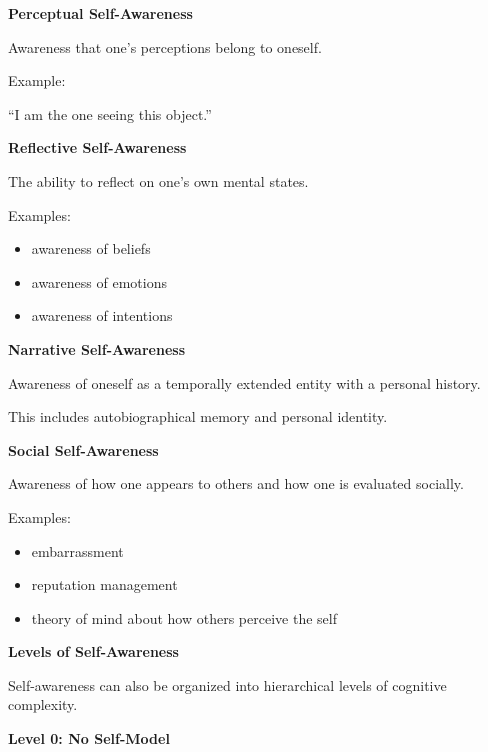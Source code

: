 \documentclass{book}
\providecommand{\ProjectDeepHeading}[2]{%
    \par\medskip\noindent\textbf{#2}\par\smallskip
}
\begin{document}
        \ProjectDeepHeading{7}{Perceptual Self-Awareness}
            
            Awareness that one's perceptions belong to oneself.
            
            Example:
            
            ``I am the one seeing this object.''
        
        \ProjectDeepHeading{7}{Reflective Self-Awareness}
            
            The ability to reflect on one's own mental states.
            
            Examples:
            
            \begin{itemize}
                \item awareness of beliefs
                \item awareness of emotions
                \item awareness of intentions
            \end{itemize}
        
        \ProjectDeepHeading{7}{Narrative Self-Awareness}
            
            Awareness of oneself as a temporally extended entity with a personal history.
            
            This includes autobiographical memory and personal identity.
        
        \ProjectDeepHeading{7}{Social Self-Awareness}
            
            Awareness of how one appears to others and how one is evaluated socially.
            
            Examples:
            
            \begin{itemize}
                \item embarrassment
                \item reputation management
                \item theory of mind about how others perceive the self
            \end{itemize}
    
    
    \ProjectDeepHeading{6}{Levels of Self-Awareness}
        
        Self-awareness can also be organized into hierarchical levels of cognitive complexity.
        
        \ProjectDeepHeading{7}{Level 0: No Self-Model}
            
\end{document}
